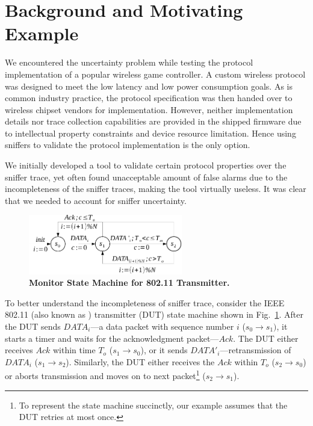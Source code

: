\section{Background and Motivating Example}
\label{sec:motivation}

We encountered the uncertainty problem while testing the protocol implementation
of a popular wireless game controller. A custom wireless protocol
was designed to meet the low latency and low power consumption goals. As is
common industry practice, the protocol specification was then handed over to
wireless chipset vendors for implementation. However, neither implementation
details nor trace collection capabilities are provided in the shipped firmware
due to intellectual property constraints and device resource limitation. Hence
using sniffers to validate the protocol implementation is the only option.

We initially developed a tool to validate certain protocol properties over the
sniffer trace, yet often found unacceptable amount of false alarms due to
the incompleteness of the sniffer traces, making the tool virtually useless. It
was clear that we needed to account for sniffer uncertainty.

\begin{figure}[t!]
  \centering
  \includegraphics[width=0.6\textwidth]{./figures/dot11_tx_ta.pdf}
  \caption{\textbf{Monitor State Machine for 802.11 Transmitter.}}
  \label{fig:dot11_tx_ta}
\end{figure}


To better understand the incompleteness of sniffer trace, consider the IEEE
802.11 (also known as \wifi{}) transmitter (DUT) state machine shown in
Fig.~\ref{fig:dot11_tx_ta}. After the DUT sends $DATA_i$---a data packet with
sequence number $i$ ($s_0\rightarrow s_1)$, it starts a timer and waits for the
acknowledgment packet---$Ack$. The DUT either receives $Ack$ within time $T_o$
($s_1\rightarrow s_0$), or it sends $DATA'_i$---retransmission of $DATA_i$
($s_1\rightarrow s_2$). Similarly, the DUT either receives the $Ack$ within $T_o$
($s_2\rightarrow s_0$) or aborts transmission and moves on to next
packet\footnote{To represent the state machine succinctly, our example assumes
that the DUT retries at most once.} ($s_2\rightarrow s_1$).


